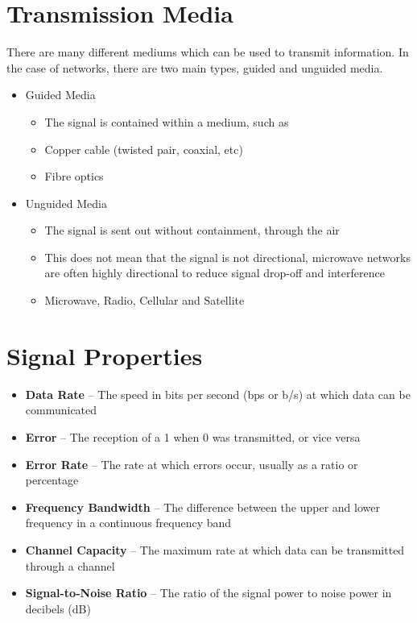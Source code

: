 
\section*{Transmission Media}

There are many different mediums which can be used to transmit information. In the case of networks, there are two main
 types, guided and unguided media.

\begin{itemize}
  \item Guided Media
  \begin{itemize}
    \item The signal is contained within a medium, such as
    \item Copper cable (twisted pair, coaxial, etc)
    \item Fibre optics
  \end{itemize}
  \item Unguided Media
  \begin{itemize}
    \item The signal is sent out without containment, through the air
    \item This does not mean that the signal is not directional, microwave networks are often highly directional to
     reduce signal drop-off and interference
    \item Microwave, Radio, Cellular and Satellite
  \end{itemize}
\end{itemize}

\section*{Signal Properties}

\begin{itemize}
  \item \textbf{Data Rate} -- The speed in bits per second (bps or b/s) at which data can be communicated
  \item \textbf{Error} -- The reception of a 1 when 0 was transmitted, or vice versa
  \item \textbf{Error Rate} -- The rate at which errors occur, usually as a ratio or percentage
  \item \textbf{Frequency Bandwidth} -- The difference between the upper and lower frequency in a continuous frequency
   band
  \item \textbf{Channel Capacity} -- The maximum rate at which data can be transmitted through a channel 
  \item \textbf{Signal-to-Noise Ratio} -- The ratio of the signal power to noise power in decibels (dB)
\end{itemize}

